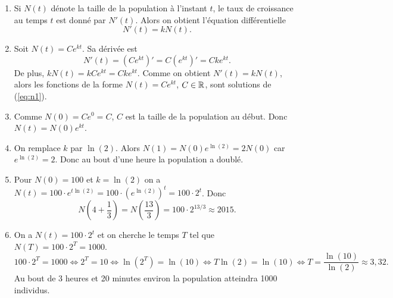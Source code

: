 \documentclass[11pt,class=report,crop=false]{standalone}
\begin{document}
\sauteligne 
\begin{enumerate} 
\item 
Si $ N(t) $ d\'enote la taille de la population \`a l'instant $ t $, le taux de 
croissance au temps $ t $ est donn\'e par $ N'(t) $. Alors on obtient l'\'equation 
diff\'erentielle 
\begin{equation} \label{eq:n1} 
N'(t) = k N(t). 
\end{equation} 
\item 
Soit $ N(t) = C e^{kt} $. Sa d\'eriv\'ee est 
\begin{equation*} 
N'(t) = (C e^{kt})' = C(e^{kt})' = Cke^{kt}. 
\end{equation*} 
De plus, $ k N(t) = kCe^{kt} = Cke^{kt} $. Comme on obtient $N'(t) = kN(t)$, alors les fonctions de la forme $ N(t) = C e^{kt} $, $ C \in \mathbb{R} $, sont 
solutions de (\ref{eq:n1}). 
\item 
Comme $ N(0) = C e^0 = C $, $ C $ est la taille de la population au d\'ebut. 
Donc $ N(t) = N(0) e^{kt} $. 
\item 
On remplace $ k $ par $ \ln(2) $. Alors $ N(1) = N(0) e^{\ln(2)} = 2 N(0) $ car $e^{\ln(2)}=2$. 
Donc au bout d'une heure la population a doubl\'e. 
\item 
Pour $ N(0) = 100 $ et $ k = \ln(2) $ on a $ N(t) = 100\cdot e^{t\ln(2)} = 100 \cdot (e^{\ln (2)})^t = 100 \cdot 2^t $. 
Donc 
\begin{equation*} 
N\left(4+\frac{1}{3}\right) = N\left(\frac{13}{3}\right) = 100 \cdot 
2^{13/3} \approx 2015. 
\end{equation*} 
\item 
On a $ N(t) = 100 \cdot 2^t $ et on cherche le temps $ T $ tel que 
$ N(T) = 100 \cdot 2^T = 1000 $. 
\begin{equation*} 
100 \cdot 2^T = 1000  \Longleftrightarrow  2^T = 10 
\Longleftrightarrow \ln(2^T) = \ln(10) 
 \Longleftrightarrow T \ln(2) = \ln(10)  
 \Longleftrightarrow T = \frac{\ln(10)}{\ln(2)} \approx 3,32. 
\end{equation*} 
Au bout de 3 heures et 20 minutes environ la population atteindra 1000 individus. 
\end{enumerate} 
\fincorrection 
\finexercice
\end{document}
